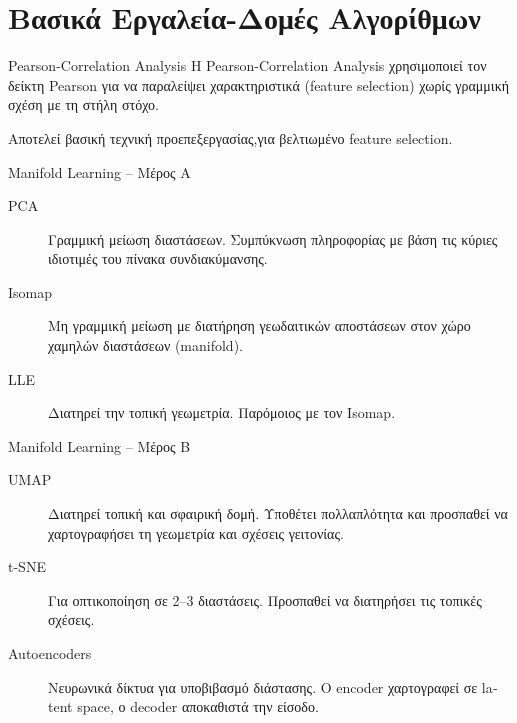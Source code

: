 \documentclass{beamer}
\newcommand{\tl}[1]{\textlatin{#1}}
\begin{document}
\section{Βασικά Εργαλεία-Δομές Αλγορίθμων}

\begin{frame}{\tl{Pearson-Correlation Analysis}}
Η \textlatin{Pearson-Correlation Analysis} χρησιμοποιεί τον δείκτη \textlatin{Pearson} για να παραλείψει χαρακτηριστικά (\textlatin{feature selection}) χωρίς γραμμική σχέση με τη στήλη στόχο.

\vspace{0.2cm}
Αποτελεί βασική τεχνική προεπεξεργασίας,για βελτιωμένο \textlatin{feature selection}.
\end{frame}

\begin{frame}{\tl{Manifold Learning} – Μέρος Α}
\begin{description}
 \item[\tl{PCA}] Γραμμική μείωση διαστάσεων. Συμπύκνωση πληροφορίας με βάση τις κύριες ιδιοτιμές του πίνακα συνδιακύμανσης.
 \item[\tl{Isomap}] Μη γραμμική μείωση με διατήρηση γεωδαιτικών αποστάσεων στον χώρο χαμηλών διαστάσεων (\textlatin{manifold}).
 \item[\tl{LLE}] Διατηρεί την τοπική γεωμετρία. Παρόμοιος με τον \textlatin{Isomap}.
\end{description}
\end{frame}

\begin{frame}{\tl{Manifold Learning} – Μέρος Β}
\begin{description}
 \item[\tl{UMAP}] Διατηρεί τοπική και σφαιρική δομή. Υποθέτει πολλαπλότητα και προσπαθεί να χαρτογραφήσει τη γεωμετρία και σχέσεις γειτονίας.
 \item[\tl{t-SNE}] Για οπτικοποίηση σε 2–3 διαστάσεις. Προσπαθεί να διατηρήσει τις τοπικές σχέσεις.
 \item[\tl{Autoencoders}] Νευρωνικά δίκτυα για υποβιβασμό διάστασης. Ο \textlatin{encoder} χαρτογραφεί σε \textlatin{latent space}, ο \textlatin{decoder} αποκαθιστά την είσοδο.
\end{description}
\end{frame}
\end{document}
